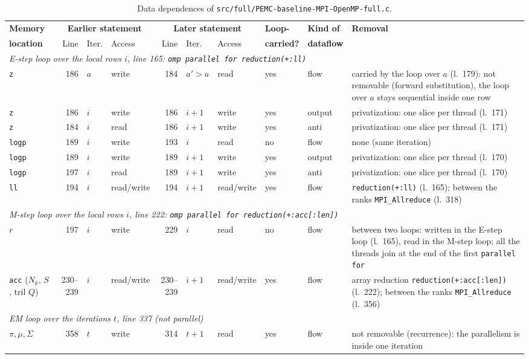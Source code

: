 \documentclass[conference,onecolumn]{IEEEtran}
\begin{document}
\begin{table}[H]
\centering
\caption{Data dependences of \texttt{src/full/PEMC-baseline-MPI-OpenMP-full.c}.}\label{tab:dep-base-full}
\scriptsize
\setlength{\tabcolsep}{3pt}
\begin{tabular}{lrllrllllp{}}
\toprule
\textbf{Memory} & \multicolumn{3}{c}{\textbf{Earlier statement}} & \multicolumn{3}{c}{\textbf{Later statement}} & \textbf{Loop-} & \textbf{Kind of} & \textbf{Removal} \\
\cmidrule(lr){2-4} \cmidrule(lr){5-7}
\textbf{location} & Line & Iter. & Access & Line & Iter. & Access & \textbf{carried?} & \textbf{dataflow} & \\
\midrule
\multicolumn{10}{p{0.92\textwidth}}{\emph{E-step loop over the local rows $i$, line 165: \texttt{omp parallel for reduction(+:ll)}}} \\
\texttt{z} & 186 & $a$ & write & 184 & $a'>a$ & read & yes & flow & carried by the loop over $a$ (l.~179): not removable (forward substitution), the loop over $a$ stays sequential inside one row \\
\texttt{z} & 186 & $i$ & write & 186 & $i+1$ & write & yes & output & privatization: one slice per thread (l.~171) \\
\texttt{z} & 184 & $i$ & read & 186 & $i+1$ & write & yes & anti & privatization: one slice per thread (l.~171) \\
\texttt{logp} & 189 & $i$ & write & 193 & $i$ & read & no & flow & none (same iteration) \\
\texttt{logp} & 189 & $i$ & write & 189 & $i+1$ & write & yes & output & privatization: one slice per thread (l.~170) \\
\texttt{logp} & 197 & $i$ & read & 189 & $i+1$ & write & yes & anti & privatization: one slice per thread (l.~170) \\
\texttt{ll} & 194 & $i$ & read/write & 194 & $i+1$ & read/write & yes & flow & \texttt{reduction(+:ll)} (l.~165); between the ranks \texttt{MPI\_Allreduce} (l.~318) \\
\midrule
\multicolumn{10}{p{0.92\textwidth}}{\emph{M-step loop over the local rows $i$, line 222: \texttt{omp parallel for reduction(+:acc[:len])}}} \\
$r$ & 197 & $i$ & write & 229 & $i$ & read & no & flow & between two loops: written in the E-step loop (l.~165), read in the M-step loop; all the threads join at the end of the first \texttt{parallel for} \\
\texttt{acc} ($N_k$, $S$, tril $Q$) & 230--239 & $i$ & read/write & 230--239 & $i+1$ & read/write & yes & flow & array reduction \texttt{reduction(+:acc[:len])} (l.~222); between the ranks \texttt{MPI\_Allreduce} (l.~356) \\
\midrule
\multicolumn{10}{p{0.92\textwidth}}{\emph{EM loop over the iterations $t$, line 337 (not parallel)}} \\
$\pi,\mu,\Sigma$ & 358 & $t$ & write & 314 & $t+1$ & read & yes & flow & not removable (recurrence): the parallelism is inside one iteration \\
\bottomrule
\end{tabular}
\end{table}
\end{document}
